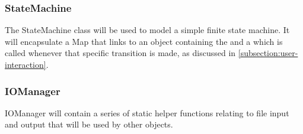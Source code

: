         \subsubsection{StateMachine}

            The StateMachine class will be used to model a simple finite state machine. It will encapsulate a Map that links  to an object containing the  and a  which is called whenever that specific transition is made, as discussed in \autoref{subsection:user-interaction}.


        \subsubsection{IOManager}

            IOManager will contain a series of static helper functions relating to file input and output that will be used by other objects.

